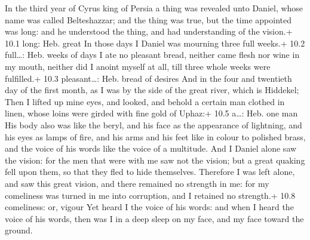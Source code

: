 In the third year of Cyrus king of Persia a thing was
revealed unto Daniel, whose name was called Belteshazzar; and the thing
was true, but the time appointed was long: and he understood the thing,
and had understanding of the vision.+ 10.1 long: Heb. great 
In those days I Daniel was mourning three full weeks.+ 10.2 full\ldots:
Heb. weeks of days  I ate no pleasant bread, neither came
flesh nor wine in my mouth, neither did I anoint myself at all, till
three whole weeks were fulfilled.+ 10.3 pleasant\ldots: Heb. bread of
desires  And in the four and twentieth day of the first
month, as I was by the side of the great river, which is Hiddekel;
 Then I lifted up mine eyes, and looked, and behold a
certain man clothed in linen, whose loins were girded with fine gold of
Uphaz:+ 10.5 a\ldots: Heb. one man  His body also was like
the beryl, and his face as the appearance of lightning, and his eyes as
lamps of fire, and his arms and his feet like in colour to polished
brass, and the voice of his words like the voice of a multitude.
 And I Daniel alone saw the vision: for the men that were
with me saw not the vision; but a great quaking fell upon them, so that
they fled to hide themselves.  Therefore I was left alone,
and saw this great vision, and there remained no strength in me: for my
comeliness was turned in me into corruption, and I retained no
strength.+ 10.8 comeliness: or, vigour  Yet heard I the
voice of his words: and when I heard the voice of his words, then was I
in a deep sleep on my face, and my face toward the ground.

